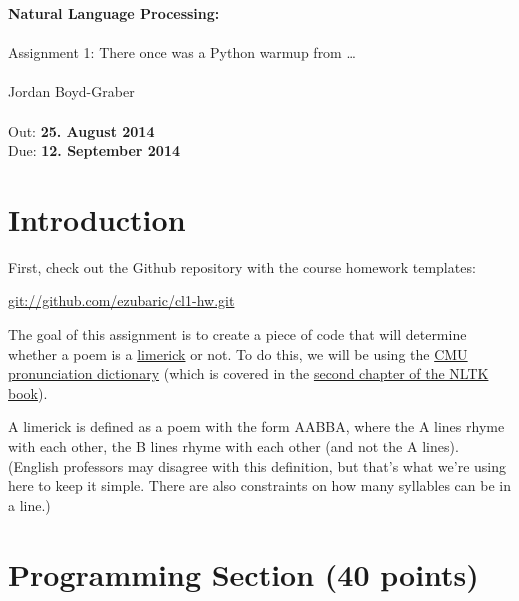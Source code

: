\documentclass[11pt]{article}
\begin{document}
\begin{center}
{\Large{\textbf{ Natural Language Processing:  }}}\\
\mbox{}\\
{\Large{Assignment 1: There once was a Python warmup from \dots}}\\
\mbox{}\\
{\large{Jordan Boyd-Graber}}\\
\mbox{}\\
{\large{Out: \textbf{25. August 2014}\\Due: \textbf{12. September 2014}}}\\
\end{center}


{}

\section*{Introduction} %
\label{sec:introduction}
First, check out the Github repository with the course homework templates:

\url{git://github.com/ezubaric/cl1-hw.git}

The goal of this assignment is to create a piece of code that will
determine whether a poem is a
\href{http://en.wikipedia.org/wiki/Limerick_(poetry)}{limerick} or
not.  To do this, we will be using the
\href{http://www.speech.cs.cmu.edu/cgi-bin/cmudict}{CMU pronunciation
  dictionary} (which is covered in the \href{http://www.nltk.org/book/ch02.html}{second chapter of the NLTK book}).

A limerick is defined as a poem with the form AABBA, where the A lines
rhyme with each other, the B lines rhyme with each other (and not the
A lines).  (English professors may disagree with this definition, but
that's what we're using here to keep it simple.  There are also
constraints on how many syllables can be in a line.)

\section*{Programming Section (40 points)}
\end{document}
